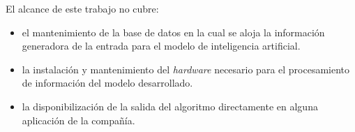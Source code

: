 El alcance de este trabajo no cubre:
\begin {itemize}
\item el mantenimiento de la base de datos en la cual se aloja la información generadora de la entrada para el modelo de inteligencia artificial.
\item la instalación y mantenimiento del \textit{hardware} necesario para el procesamiento de información del modelo desarrollado.
\item la disponibilización de la salida del algoritmo directamente en alguna aplicación de la compañía.
\end {itemize}